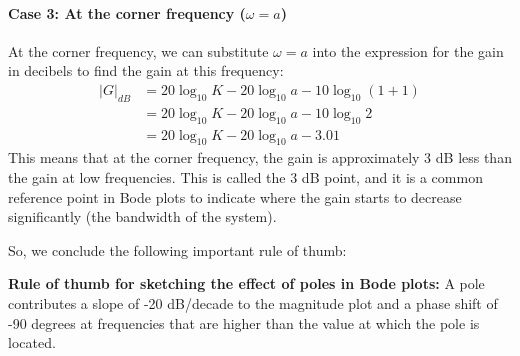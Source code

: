 \documentclass{ee122_notes}
\begin{document}
\paragraph{Case 3: At the corner frequency ($\omega = a$)}
At the corner frequency, we can substitute \( \omega = a \) into the expression for the gain in decibels to find the gain at this frequency:
\begin{align*}
|G|_{dB} &= 20 \log_{10} K - 20 \log_{10} a - 10 \log_{10} \left(1 + 1\right) \\
&= 20 \log_{10} K - 20 \log_{10} a - 10 \log_{10} 2 \\
&= 20 \log_{10} K - 20 \log_{10} a - 3.01
\end{align*}
This means that at the corner frequency, the gain is approximately 3 dB less than the gain at low frequencies. This is called the 3 dB point, and it is a common reference point in Bode plots to indicate where the gain starts to decrease significantly (the bandwidth of the system).

So, we conclude the following important rule of thumb:
\begin{center}
  \textbf{Rule of thumb for sketching the effect of poles in Bode plots:} A pole contributes a slope of -20 dB/decade to the magnitude plot and a phase shift of -90 degrees at frequencies that are higher than the value at which the pole is located.
\end{center}
\end{document}
